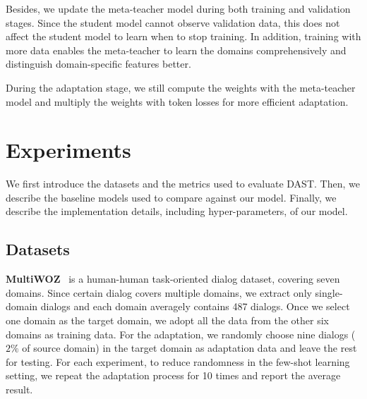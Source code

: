 \documentclass[letterpaper]{article} %
\begin{document}
Besides, we update the meta-teacher model during both training and validation stages. Since the student model cannot observe validation data, this does not affect the student model to learn when to stop training. In addition, training with more data enables the meta-teacher to learn the domains comprehensively and distinguish domain-specific features better.

During the adaptation stage, we still compute the weights with the meta-teacher model and multiply the weights with token losses for more efficient adaptation.







\section*{Experiments}
We first introduce the datasets and the metrics used to evaluate DAST. Then, we describe the baseline models used to compare against our model. Finally, we describe the implementation details, including hyper-parameters, of our model.

\subsection*{Datasets}
\label{multiwoz}
\noindent \textbf{MultiWOZ}~\citep{budzianowski2018multiwoz} is a human-human task-oriented dialog dataset, covering seven domains. Since certain dialog covers multiple domains, we extract only single-domain dialogs and each domain averagely contains 487 dialogs. Once we select one domain as the target domain, we adopt all the data from the other six domains as training data. For the adaptation, we randomly choose nine dialogs ($2\%$ of source domain) in the target domain as adaptation data and leave the rest for testing. For each experiment, to reduce randomness in the few-shot learning setting, we repeat the adaptation process for 10 times and report the average result. 
\end{document}
